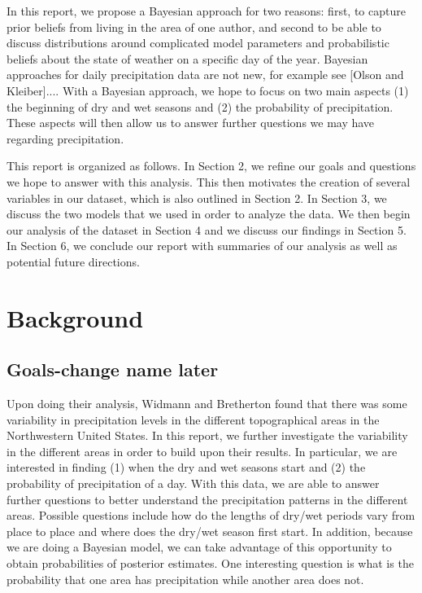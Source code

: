 \documentclass{article}
\begin{document}
In this report, we propose a Bayesian approach for two reasons: first, to capture prior beliefs  from living in the area of one author, and second to be able to discuss distributions around complicated model parameters and probabilistic beliefs about the state of weather on a specific day of the year. Bayesian approaches for daily precipitation data are not new, for example see [Olson and Kleiber].... With a Bayesian approach, we hope to focus on two main aspects (1) the beginning of dry and wet seasons and (2) the probability of precipitation. These aspects will then allow us to answer further questions we may have regarding precipitation. 

This report is organized as follows. In Section 2, we refine our goals and questions we hope to answer with this analysis. This then motivates the creation of several variables in our dataset, which is also outlined in Section 2. In Section 3, we discuss the two models that we used in order to analyze the data.  We then begin our analysis of the dataset in Section 4 and we discuss our findings in Section 5. In Section 6, we conclude our report with summaries of our analysis as well as potential future directions.

\section{Background}

\subsection{Goals-change name later}
Upon doing their analysis, Widmann and Bretherton found that there was some variability in precipitation levels in the different topographical areas in the Northwestern United States. In this report, we further investigate the variability in the different areas in order to build upon their results. In particular, we are interested in finding (1) when the dry and wet seasons start and (2) the probability of precipitation of a day. With this data, we are able to answer further questions to better understand the precipitation patterns in the different areas. Possible questions include how do the lengths of dry/wet periods vary from place to place and where does the dry/wet season first start. In addition, because we are doing a Bayesian model, we can take advantage of this opportunity to obtain probabilities of  posterior estimates. One interesting question is what is the probability that one area has precipitation while another area does not. %
\end{document}

